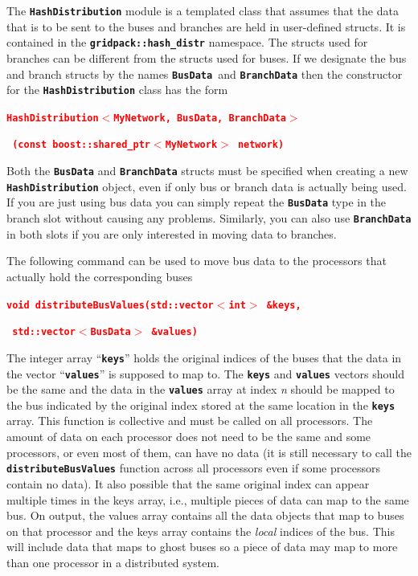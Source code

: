 \documentclass[12pt]{report} %
\begin{document}
The \texttt{\textbf{HashDistribution}} module is a templated class that assumes that the data that is to be sent to the buses and branches are held in user-defined structs. It is contained in the \texttt{\textbf{gridpack::hash\_distr}} namespace. The structs used for branches can be different from the structs used for buses. If we designate the bus and branch structs by the names \texttt{\textbf{BusData }}and \texttt{\textbf{BranchData}} then the constructor for the \texttt{\textbf{HashDistribution}} class has the form

\textcolor{red}{\texttt{\textbf{HashDistribution$\boldsymbol{\mathrm{<}}$MyNetwork, BusData, BranchData$\boldsymbol{\mathrm{>}}$}}}

\textcolor{red}{\texttt{\textbf{        (const boost::shared\_ptr$\boldsymbol{\mathrm{<}}$MyNetwork$\boldsymbol{\mathrm{>}}$ network)}}}

Both the \texttt{\textbf{BusData}} and \texttt{\textbf{BranchData}} structs must be specified when creating a new \texttt{\textbf{HashDistribution}} object, even if only bus or branch data is actually being used. If you are just using bus data you can simply repeat the \texttt{\textbf{BusData}} type in the branch slot without causing any problems. Similarly, you can also use \texttt{\textbf{BranchData}} in both slots if you are only interested in moving data to branches.

The following command can be used to move bus data to the processors that actually hold the corresponding buses

\textcolor{red}{\texttt{\textbf{void distributeBusValues(std::vector$\boldsymbol{\mathrm{<}}$int$\boldsymbol{\mathrm{>}}$ \&keys,}}}

\textcolor{red}{\texttt{\textbf{                         std::vector$\boldsymbol{\mathrm{<}}$BusData$\boldsymbol{\mathrm{>}}$ \&values)}}}

The integer array ``\texttt{\textbf{keys}}'' holds the original indices of the buses that the data in the vector ``\texttt{\textbf{values}}'' is supposed to map to. The \texttt{\textbf{keys}} and \texttt{\textbf{values}} vectors should be the same and the data in the \texttt{\textbf{values}} array at index \textit{n} should be mapped to the bus indicated by the original index stored at the same location in the \texttt{\textbf{keys}} array. This function is collective and must be called on all processors. The amount of data on each processor does not need to be the same and some processors, or even most of them, can have no data (it is still necessary to call the \texttt{\textbf{distributeBusValues}} function across all processors even if some processors contain no data). It also possible that the same original index can appear multiple times in the keys array, i.e., multiple pieces of data can map to the same bus. On output, the values array contains all the data objects that map to buses on that processor and the keys array contains the \textit{local} indices of the bus. This will include data that maps to ghost buses so a piece of data may map to more than one processor in a distributed system.
\end{document}
